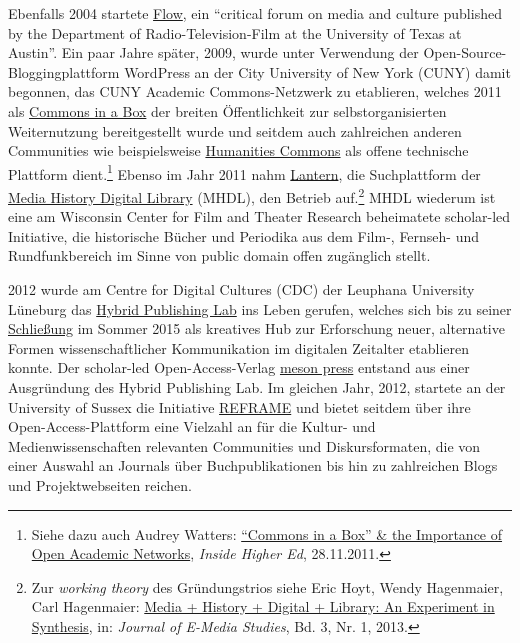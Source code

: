 \documentclass[a4paper,
fontsize=11pt,
oneside,
numbers=noperiodatend,
parskip=half-,
bibliography=totoc,
final
]{scrartcl}
\begin{document}
Ebenfalls 2004 startete
\href{https://www.flowjournal.org/test-page/}{Flow}, ein
\enquote{critical forum on media and culture published by the Department
of Radio-Television-Film at the University of Texas at Austin}. Ein paar
Jahre später, 2009, wurde unter Verwendung der
Open-Source-Bloggingplattform WordPress an der City University of New
York (CUNY) damit begonnen, das CUNY Academic Commons-Netzwerk zu
etablieren, welches 2011 als \href{https://commonsinabox.org/}{Commons
in a Box} der breiten Öffentlichkeit zur selbstorganisierten
Weiternutzung bereitgestellt wurde und seitdem auch zahlreichen anderen
Communities wie beispielsweise \href{https://hcommons.org/}{Humanities
Commons} als offene technische Plattform dient.\footnote{Siehe dazu auch
  Audrey Watters:
  \href{https://www.insidehighered.com/blogs/hack-higher-education/commons-box-importance-open-academic-networks}{\enquote{Commons
  in a Box} \& the Importance of Open Academic Networks}, \emph{Inside
  Higher Ed}, 28.11.2011.} Ebenso im Jahr 2011 nahm
\href{https://lantern.mediahist.org/}{Lantern}, die Suchplattform der
\href{http://mediahistoryproject.org}{Media History Digital Library}
(MHDL), den Betrieb auf.\footnote{Zur \emph{working theory} des
  Gründungstrios siehe Eric Hoyt, Wendy Hagenmaier, Carl Hagenmaier:
  \href{https://dx.doi.org/10.1349/PS1.1938-6060.A.430}{Media + History
  + Digital + Library: An Experiment in Synthesis}, in: \emph{Journal of
  E-Media Studies}, Bd. 3, Nr. 1, 2013.} MHDL wiederum ist eine am
Wisconsin Center for Film and Theater Research beheimatete scholar-led
Initiative, die historische Bücher und Periodika aus dem Film-, Fernseh-
und Rundfunkbereich im Sinne von public domain offen zugänglich stellt.

2012 wurde am Centre for Digital Cultures (CDC) der Leuphana University
Lüneburg das
\href{https://www.leuphana.de/en/research-centers/cdc/labs-projects/finished-projects/hybrid-publishing-lab.html}{Hybrid
Publishing Lab} ins Leben gerufen, welches sich bis zu seiner
\href{https://web.archive.org/web/20200512051745/https://hybridpublishing.org/}{Schließung}
im Sommer 2015 als kreatives Hub zur Erforschung neuer, alternative
Formen wissenschaftlicher Kommunikation im digitalen Zeitalter
etablieren konnte. Der scholar-led Open-Access-Verlag
\href{https://meson.press/}{meson press} entstand aus einer Ausgründung
des Hybrid Publishing Lab. Im gleichen Jahr, 2012, startete an der
University of Sussex die Initiative
\href{https://reframe.sussex.ac.uk/}{REFRAME} und bietet seitdem über
ihre Open-Access-Plattform eine Vielzahl an für die Kultur- und
Medienwissenschaften relevanten Communities und Diskursformaten, die von
einer Auswahl an Journals über Buchpublikationen bis hin zu zahlreichen
Blogs und Projektwebseiten reichen.
\end{document}
